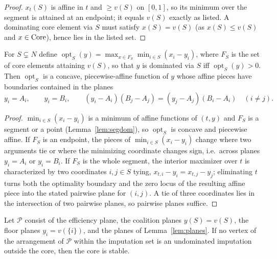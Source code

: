 \begin{proof}
$x_t(S)$ is affine in $t$ and $\ge v(S)$ on $[0,1]$, so its minimum over the
segment is attained at an endpoint; it equals $v(S)$ exactly as listed. A
dominating core element via $S$ must satisfy $x(S)=v(S)$ (as $x(S)\le v(S)$
and $x\in\operatorname{Core}$), hence lies in the listed set.
\end{proof}

\begin{lemma}
\label{lem:planes}
For $S\subsetneq N$ define
$\operatorname{opt}_S(y)=\max_{x\in F_S}\min_{i\in S}(x_i-y_i)$, where
$F_S$ is the set of core elements attaining $v(S)$, so that $y$ is dominated
via $S$ iff $\operatorname{opt}_S(y)>0$. Then $\operatorname{opt}_S$ is a
concave, piecewise-affine function of $y$ whose affine pieces have boundaries
contained in the planes
\[
  y_i=A_i,\qquad y_i=B_i,\qquad
  (y_i-A_i)(B_j-A_j)=(y_j-A_j)(B_i-A_i)\quad(i\neq j).
\]
\end{lemma}

\begin{proof}
$\min_{i\in S}(x_i-y_i)$ is a minimum of affine functions of $(t,y)$ and $F_S$
is a segment or a point (Lemma~\ref{lem:segdom}), so $\operatorname{opt}_S$ is
concave and piecewise affine. If $F_S$ is an endpoint, the pieces of
$\min_{i\in S}(x_i-y_i)$ change where two arguments tie or where the minimizing
coordinate changes sign, i.e.\ across planes $y_i=A_i$ or $y_i=B_i$. If $F_S$
is the whole segment, the interior maximizer over $t$ is characterized by two
coordinates $i,j\in S$ tying, $x_{t,i}-y_i=x_{t,j}-y_j$; eliminating $t$ turns
both the optimality boundary and the zero locus of the resulting affine piece
into the stated pairwise plane for $(i,j)$. A tie of three coordinates lies in
the intersection of two pairwise planes, so pairwise planes suffice.
\end{proof}

\begin{proposition}
\label{prop:cert}
Let $\mathcal P$ consist of the efficiency plane, the coalition planes
$y(S)=v(S)$, the floor planes $y_i=v(\{i\})$, and the planes of
Lemma~\ref{lem:planes}. If no vertex of the arrangement of $\mathcal P$ within
the imputation set is an undominated imputation outside the core, then the core
is stable.
\end{proposition}

